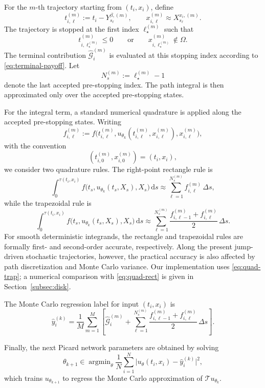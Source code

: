 \documentclass[a4paper,fleqn]{cas-sc}
\DeclareMathOperator*{\argmin}{argmin}
\newcommand{\rd}{\mathrm{d}}
\begin{document}
For the $m$-th trajectory starting from $(t_i,x_i)$, define
\[
t_{i,\ell}^{(m)}
:=
t_i-Y_{s_\ell}^{\beta,(m)},
\qquad
x_{i,\ell}^{(m)}
\approx
X_{s_\ell}^{x_i,(m)}.
\]
The trajectory is stopped at the first index $\ell_\star^{(m)}$ such that
\[
t_{i,\ell_\star^{(m)}}^{(m)}\le0
\qquad\text{or}\qquad
x_{i,\ell_\star^{(m)}}^{(m)}\notin\Omega .
\]
The terminal contribution $\widehat{\mathcal{G}}_i^{(m)}$ is evaluated at this
stopping index according to \eqref{eq:terminal-payoff}. Let
\[
N_s^{(m)}:=\ell_\star^{(m)}-1
\]
denote the last accepted pre-stopping index. The path integral is then
approximated only over the accepted pre-stopping states.

For the integral term, a standard numerical quadrature is applied along the
accepted pre-stopping states. Writing
\[
f_{i,\ell}^{(m)}
:=
f\!\bigl(
t_{i,\ell}^{(m)},
u_{\theta_k}(t_{i,\ell}^{(m)},x_{i,\ell}^{(m)}),
x_{i,\ell}^{(m)}
\bigr),
\]
with the convention
\[
(t_{i,0}^{(m)},x_{i,0}^{(m)})=(t_i,x_i),
\]
we consider two quadrature rules. The right-point rectangle rule is
\begin{equation}\label{eq:quad-rect}
\int_0^{\tau(t_i,x_i)}
f\!\bigl(t_s,u_{\theta_k}(t_s,X_s),X_s\bigr)\,\rd s
\approx
\sum_{\ell=1}^{N_s^{(m)}}
f_{i,\ell}^{(m)}\,\Delta s ,
\end{equation}
while the trapezoidal rule is
\begin{equation}\label{eq:quad-trap}
\int_0^{\tau(t_i,x_i)}
f\!\bigl(t_s,u_{\theta_k}(t_s,X_s),X_s\bigr)\,\rd s
\approx
\sum_{\ell=1}^{N_s^{(m)}}
\frac{
f_{i,\ell-1}^{(m)}+f_{i,\ell}^{(m)}
}{2}\,\Delta s .
\end{equation}
For smooth deterministic integrands, the rectangle and trapezoidal rules are
formally first- and second-order accurate, respectively. Along the present
jump-driven stochastic trajectories, however, the practical accuracy is also
affected by path discretization and Monte Carlo variance. Our implementation
uses \eqref{eq:quad-trap}; a numerical comparison with \eqref{eq:quad-rect} is
given in Section~\ref{subsec:disk}.

The Monte Carlo regression label for input $(t_i,x_i)$ is
\begin{equation}\label{eq:mc-label-dpi}
\widehat{y}_i^{(k)}
=
\frac{1}{M}
\sum_{m=1}^M
\left[
\widehat{\mathcal{G}}_i^{(m)}
+
\sum_{\ell=1}^{N_s^{(m)}}
\frac{
f_{i,\ell-1}^{(m)}+f_{i,\ell}^{(m)}
}{2}\,\Delta s
\right].
\end{equation}

Finally, the next Picard network parameters are obtained by solving
\begin{equation}\label{eq:supervised-loss-dpi}
\theta_{k+1}
\in
\argmin_{\theta}
\frac{1}{N}
\sum_{i=1}^N
\bigl|u_{\theta}(t_i,x_i)-\widehat{y}_i^{(k)}\bigr|^2,
\end{equation}
which trains $u_{\theta_{k+1}}$ to regress the Monte Carlo approximation of
$\mathcal{T}u_{\theta_k}$.
\end{document}

